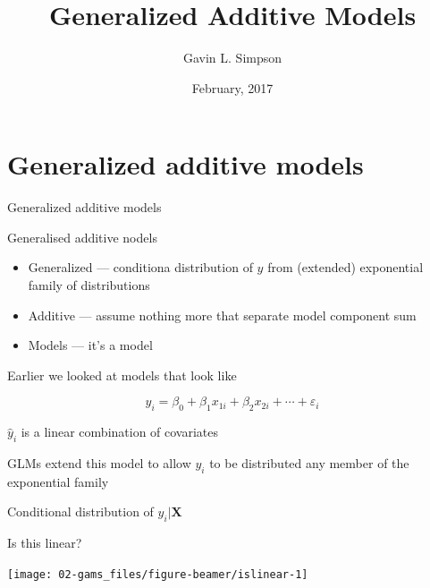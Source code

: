 \documentclass[10pt,ignorenonframetext,compress, aspectratio=169]{beamer}
\title{Generalized Additive Models}
\author{Gavin L. Simpson}
\date{February, 2017}
\providecommand{\tightlist}{%
  \setlength{\itemsep}{0pt}\setlength{\parskip}{0pt}}
\begin{document}
\frame{\titlepage}

\section{Generalized additive models}\label{generalized-additive-models}

\begin{frame}{Generalized additive models}

\alert{Generalised additive nodels}

\begin{itemize}
\tightlist
\item
  Generalized --- conditiona distribution of \(y\) from (extended)
  exponential family of distributions
\item
  Additive --- assume nothing more that separate model component sum
\item
  Models --- it's a model
\end{itemize}

Earlier we looked at models that look like

\[
y_i = \beta_0 + \beta_1 x_{1i} + \beta_2 x_{2i} + \cdots + \varepsilon_i
\]

\(\hat{y}_i\) is a linear combination of covariates

GLMs extend this model to allow \(y_i\) to be distributed any member of
the exponential family

Conditional distribution of \(y_i | \mathbf{X}\)

\end{frame}

\begin{frame}{Is this linear?}

\begin{center}\texttt{[image: 02-gams\_files/figure-beamer/islinear-1]} \end{center}

\end{frame}
\end{document}
